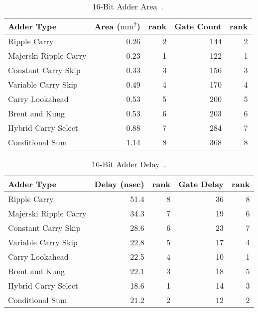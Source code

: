\documentclass[times, twocolumn, 10pt]{article}
\begin{document}
\begin{center}
\begin{table*}[ht]
  \centering
  \caption{$16$-Bit Adder Area~\cite{378090}.}
  \label{par_add_area}
  \begin{tabular}{||l|r|r|r|r||} \hline
    Adder Type              & Area ($\mbox{mm}^{2}$) & rank & Gate Count & rank \\ \hline
    Ripple Carry            & 0.26 & 2 & 144 & 2 \\ \hline
    Majerski Ripple Carry   & 0.23 & 1 & 122 & 1 \\ \hline
    Constant Carry Skip     & 0.33 & 3 & 156 & 3 \\ \hline
    Variable Carry Skip     & 0.49 & 4 & 170 & 4 \\ \hline
    Carry Lookahead         & 0.53 & 5 & 200 & 5 \\ \hline
    Brent and Kung          & 0.53 & 6 & 203 & 6 \\ \hline
    Hybrid Carry Select     & 0.88 & 7 & 284 & 7 \\ \hline
    Conditional Sum         & 1.14 & 8 & 368 & 8 \\ \hline
  \end{tabular}
\end{table*}
\begin{table*}[ht]
  \centering
  \caption{$16$-Bit Adder Delay~\cite{378090}.}
  \label{par_add_del_16_simp}
  \begin{tabular}{||l|r|r|r|r||} \hline
    Adder Type              & Delay (nsec) & rank & Gate Delay & rank \\ \hline
    Ripple Carry            & 51.4 & 8 & 36 & 8 \\ \hline
    Majerski Ripple Carry   & 34.3 & 7 & 19 & 6 \\ \hline
    Constant Carry Skip     & 28.6 & 6 & 23 & 7 \\ \hline
    Variable Carry Skip     & 22.8 & 5 & 17 & 4 \\ \hline
    Carry Lookahead         & 22.5 & 4 & 10 & 1 \\ \hline
    Brent and Kung          & 22.1 & 3 & 18 & 5 \\ \hline
    Hybrid Carry Select     & 18.6 & 1 & 14 & 3 \\ \hline
    Conditional Sum         & 21.2 & 2 & 12 & 2 \\ \hline
  \end{tabular}
\end{table*}
\begin{table*}[ht]

\end{table*}
\end{center}
\end{document}
